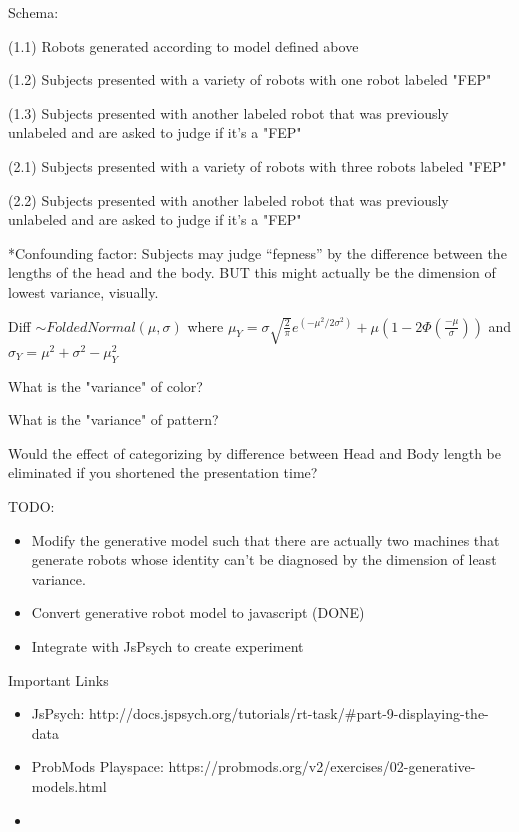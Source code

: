 \documentclass[12pt]{article}
\begin{document}
\noindent Schema: 

\noindent (1.1) Robots generated according to model defined above

\noindent (1.2) Subjects presented with a variety of robots with one robot labeled "FEP"

\noindent (1.3) Subjects presented with another labeled robot that was previously unlabeled and are asked to judge if it's a "FEP"

\noindent (2.1) Subjects presented with a variety of robots with three robots labeled "FEP"

\noindent (2.2) Subjects presented with another labeled robot that was previously unlabeled and are asked to judge if it's a "FEP"

\vspace{0.2in}

\noindent **Confounding factor: Subjects may judge ``fepness'' by the difference between the lengths of the head and the body. BUT this might actually be the dimension of lowest variance, visually.

\vspace{0.2in}

\noindent Diff $\sim FoldedNormal(\mu,\sigma)$ where $\mu_Y = \sigma \sqrt{\frac{2}{\pi}}e^{(-\mu^2/2\sigma^2)} + \mu (1-2\Phi(\frac{-\mu}{\sigma}))$ and $\sigma_Y = \mu^2 + \sigma^2 - \mu_Y ^2$

\noindent What is the "variance" of color?

\noindent What is the "variance" of pattern?

\noindent Would the effect of categorizing by difference between Head and Body length be eliminated if you shortened the presentation time?

\vspace{0.5in}

\noindent TODO:
\begin{itemize}
	\item Modify the generative model such that there are actually two machines that generate robots whose identity can't be diagnosed by the dimension of least variance. 
	\item Convert generative robot model to javascript (DONE)
	\item Integrate with JsPsych to create experiment
\end{itemize}

\vspace{0.5in}
\noindent Important Links
\begin{itemize}
	\item JsPsych: http://docs.jspsych.org/tutorials/rt-task/#part-9-displaying-the-data
	\item ProbMods Playspace: https://probmods.org/v2/exercises/02-generative-models.html
	\item 
\end{itemize}
\end{document}
